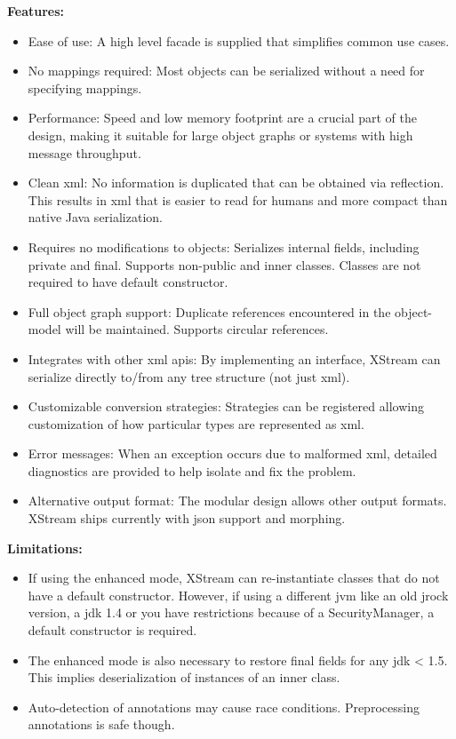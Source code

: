 \textbf{Features:}
\begin{itemize}
\item{}Ease of use: A high level facade is supplied that simplifies common use cases.
\item{}No mappings required: Most objects can be serialized without a need for specifying mappings.
\item{}Performance: Speed and low memory footprint are a crucial part of the design, making it suitable for large object graphs or systems with high message throughput.
\item{}Clean \gls{xml}: No information is duplicated that can be obtained via reflection. This results in \gls{xml} that is easier to read for humans and more compact than native Java serialization.
\item{}Requires no modifications to objects: Serializes internal fields, including private and final. Supports non-public and inner classes. Classes are not required to have default constructor.
\item{}Full object graph support: Duplicate references encountered in the object-model will be maintained. Supports circular references.
\item{}Integrates with other \gls{xml} \gls{api}s: By implementing an interface, XStream can serialize directly to/from any tree structure (not just \gls{xml}).
\item{}Customizable conversion strategies: Strategies can be registered allowing customization of how particular types are represented as \gls{xml}.
\item{}Error messages: When an exception occurs due to malformed \gls{xml}, detailed diagnostics are provided to help isolate and fix the problem.
\item{}Alternative output format: The modular design allows other output formats. XStream ships currently with \gls{json} support and morphing.
\end{itemize}

\textbf{Limitations:}
\begin{itemize}
\item{}If using the enhanced mode, XStream can re-instantiate classes that do not have a default constructor. However, if using a different \gls{jvm} like an old \gls{jrock} version, a \gls{jdk} 1.4 or you have restrictions because of a SecurityManager, a default constructor is required.
\item{}The enhanced mode is also necessary to restore final fields for any \gls{jdk} < 1.5. This implies deserialization of instances of an inner class.
\item{}Auto-detection of annotations may cause race conditions. Preprocessing annotations is safe though.
\end{itemize}


